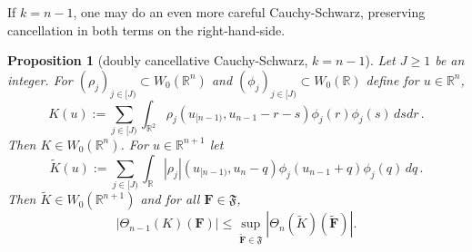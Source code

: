 \documentclass[12pt,reqno]{amsart}
\theoremstyle{plain}
\newtheorem{proposition}[theorem]{Proposition}
\numberwithin{equation}{section}
\theoremstyle{remark}
\newcommand{\uses}[1]{}
\newcommand{\usesdefs}[1]{}
\newcommand{\R}{{\mathbb R}}
\newcommand{\F}{\mathbf{F}}
\begin{document}
If $k=n-1$, one may do an even more careful Cauchy-Schwarz, preserving cancellation in both terms on the right-hand-side.


\begin{proposition}[doubly cancellative Cauchy-Schwarz, $k=n-1$]\label{doubly cancellative Cauchy-Schwarz}\uses{}\usesdefs{auto:Wiener-space-definition,normalized function tuples,prism Brascamp--Lieb}
Let $J\ge 1$ be an integer. For $(\rho_j)_{j\in[J)}\subset W_0(\R^n)$ and
$(\phi_j)_{j\in [J)}\subset W_0(\R)$ define for $u\in \R^n$,
\begin{equation}\label{auto:Cauchy-Schwarz-terminal-kernel-K}
    K(u):=\sum_{j\in [J)}\int_{\R^2} \rho_j(u_{[n-1)}, u_{n-1}-r-s) \phi_j(r) \phi_j(s) \, ds dr\, .
\end{equation}
Then $K\in W_0(\R^n)$.
For $u\in\R^{n+1}$ let
\begin{equation}\label{auto:Cauchy-Schwarz-terminal-kernel-tilde-K}
    \tilde{K}(u):=\sum_{j\in [J)}\int_\R |\rho_j|(u_{[n-1)}, u_{n}-q) \phi_j(u_{n-1}+q) \phi_j(q) \, dq\, .
\end{equation}
Then $\tilde{K}\in W_0(\R^{n+1})$ and for all $\F\in\mathfrak{F}$,
\begin{equation}\label{auto:Cauchy-Schwarz-at-n-minus-one-bound}
    |\Theta_{n-1}(K)(\F)| \le \sup_{\mathbf{\tilde{F}}\in\mathfrak{F}} |\Theta_{n}(\tilde{K})(\mathbf{\tilde{F}})|.
\end{equation}
\end{proposition}
\end{document}
